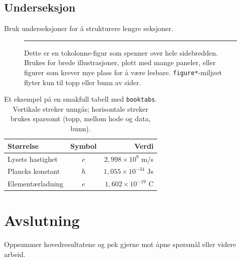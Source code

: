 \documentclass[a4paper,10pt,twocolumn]{article}
\begin{document}
\subsection{Underseksjon}

Bruk underseksjoner for å strukturere lengre seksjoner.

\begin{figure}[t]
  \centering
  \rule{0.9\linewidth}{3.5cm}   %
  \caption{Dette er en tokolonne-figur som spenner over hele
           sidebredden. Brukes for brede illustrasjoner, plott
           med mange paneler, eller figurer som krever mye plass
           for å være lesbare. \texttt{figure*}-miljøet flyter
           kun til topp eller bunn av sider.}
  \label{fig:bred}
\end{figure}

\begin{table}[t]
  \centering
  \caption{Et eksempel på en smakfull tabell med \texttt{booktabs}.
           Vertikale streker unngås; horisontale streker brukes
           sparsomt (topp, mellom hode og data, bunn).}
  \label{tab:eksempel}
  \begin{tabular}{lcr}
    \toprule
    Størrelse & Symbol & Verdi \\
    \midrule
    Lysets hastighet   & $c$      & $2{,}998 \times 10^8$ m/s \\
    Plancks konstant   & $\hbar$  & $1{,}055 \times 10^{-34}$ Js \\
    Elementærladning   & $e$      & $1{,}602 \times 10^{-19}$ C \\
    \bottomrule
  \end{tabular}
\end{table}

\section{Avslutning}

Oppsummer hovedresultatene og pek gjerne mot åpne spørsmål eller
videre arbeid.



\end{document}
